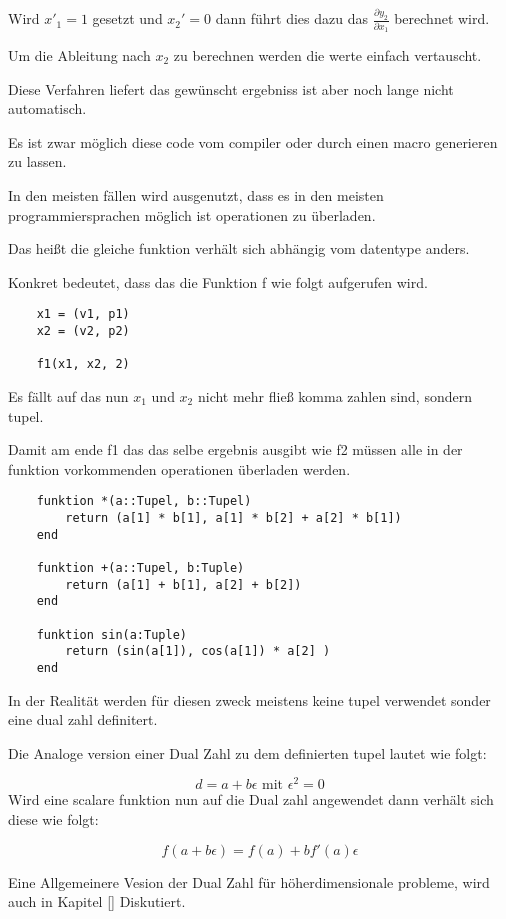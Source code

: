 Wird $x'_1 = 1$ gesetzt und $x_2' = 0$ dann führt dies dazu das $\frac{\partial y_2}{\partial x_1}$ berechnet wird.

Um die Ableitung nach $x_2$ zu berechnen werden die werte einfach vertauscht.

Diese Verfahren liefert das gewünscht ergebniss ist aber noch lange nicht automatisch.

Es ist zwar möglich diese code vom compiler oder durch einen macro generieren zu lassen.

In den meisten fällen wird ausgenutzt, dass es in den meisten 
programmiersprachen möglich ist operationen zu überladen.

Das heißt die gleiche funktion verhält sich abhängig vom datentype anders.

Konkret bedeutet, dass das die Funktion f wie folgt aufgerufen wird.

\begin{lstlisting}
	x1 = (v1, p1)
    x2 = (v2, p2)
    
    f1(x1, x2, 2)
\end{lstlisting}


Es fällt auf das nun $x_1$ und $x_2$ nicht mehr fließ komma zahlen sind, sondern tupel.

Damit am ende f1 das das selbe ergebnis ausgibt wie f2 müssen alle in der funktion vorkommenden operationen überladen werden.

\begin{lstlisting}
	funktion *(a::Tupel, b::Tupel)
    	return (a[1] * b[1], a[1] * b[2] + a[2] * b[1]) 
    end
    
    funktion +(a::Tupel, b:Tuple)
    	return (a[1] + b[1], a[2] + b[2])
    end
    
    funktion sin(a:Tuple)
    	return (sin(a[1]), cos(a[1]) * a[2] ) 
    end
\end{lstlisting}


In der Realität werden für diesen zweck meistens keine tupel verwendet sonder eine dual zahl definitert.

Die Analoge version einer Dual Zahl zu dem definierten tupel lautet wie folgt:

$$
	d = a + b \epsilon \text{ mit } \epsilon^2 = 0
$$
Wird eine scalare funktion nun auf die Dual zahl angewendet dann verhält sich diese wie folgt:

$$
	f( a + b \epsilon) = f(a) + b f'(a) \epsilon
$$

Eine Allgemeinere Vesion der Dual Zahl für höherdimensionale probleme, wird auch in Kapitel \ref{} Diskutiert.

